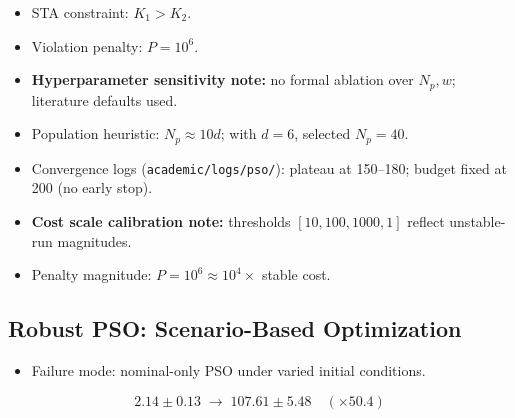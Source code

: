 \documentclass[10pt, a4paper]{article}
\begin{document}
\begin{center}
\end{center}

\begin{itemize}[leftmargin=1.5em,itemsep=0.2em]
  \item STA constraint: $K_1 > K_2$.
  \item Violation penalty: $P = 10^6$.
  \item \textbf{Hyperparameter sensitivity note:}
  no formal ablation over $N_p,w$; literature defaults used.
  \item Population heuristic: $N_p \approx 10d$; with $d=6$, selected $N_p=40$.
  \item Convergence logs (\texttt{academic/logs/pso/}): plateau at 150--180;
  budget fixed at 200 (no early stop).
  \item \textbf{Cost scale calibration note:}
  thresholds $[10,100,1000,1]$ reflect unstable-run magnitudes.
  \item Penalty magnitude: $P=10^6 \approx 10^4\times$ stable cost.
\end{itemize}

\subsection{Robust PSO: Scenario-Based Optimization}
\label{sec:robustpso}

\begin{itemize}[leftmargin=1.5em,itemsep=0.2em]
  \item Failure mode: nominal-only PSO under varied initial conditions.
\end{itemize}
\begin{equation}
  2.14 \pm 0.13
  \;\longrightarrow\;
  107.61 \pm 5.48
  \quad (\times 50.4)
\end{equation}
\end{document}
